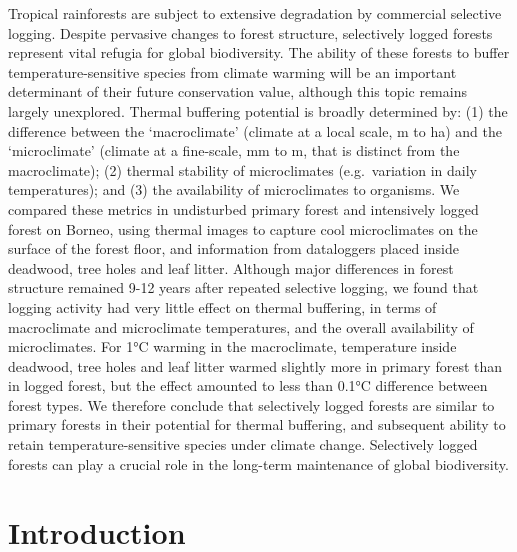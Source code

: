 \documentclass[12pt,a4paper,]{report}
\theoremstyle{definition}
\theoremstyle{definition}
\theoremstyle{definition}
\theoremstyle{remark}
\begin{document}
Tropical rainforests are subject to extensive degradation by commercial
selective logging. Despite pervasive changes to forest structure,
selectively logged forests represent vital refugia for global
biodiversity. The ability of these forests to buffer
temperature-sensitive species from climate warming will be an important
determinant of their future conservation value, although this topic
remains largely unexplored. Thermal buffering potential is broadly
determined by: (1) the difference between the `macroclimate' (climate at
a local scale, m to ha) and the `microclimate' (climate at a fine-scale,
mm to m, that is distinct from the macroclimate); (2) thermal stability
of microclimates (e.g.~variation in daily temperatures); and (3) the
availability of microclimates to organisms. We compared these metrics in
undisturbed primary forest and intensively logged forest on Borneo,
using thermal images to capture cool microclimates on the surface of the
forest floor, and information from dataloggers placed inside deadwood,
tree holes and leaf litter. Although major differences in forest
structure remained 9-12 years after repeated selective logging, we found
that logging activity had very little effect on thermal buffering, in
terms of macroclimate and microclimate temperatures, and the overall
availability of microclimates. For 1°C warming in the macroclimate,
temperature inside deadwood, tree holes and leaf litter warmed slightly
more in primary forest than in logged forest, but the effect amounted to
less than 0.1°C difference between forest types. We therefore conclude
that selectively logged forests are similar to primary forests in their
potential for thermal buffering, and subsequent ability to retain
temperature-sensitive species under climate change. Selectively logged
forests can play a crucial role in the long-term maintenance of global
biodiversity.

\section{Introduction}\label{introduction-2}
\end{document}
